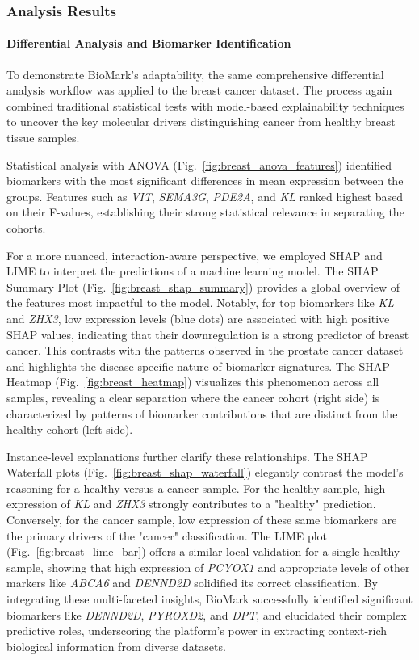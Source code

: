 \documentclass[journal]{IEEEtran}
\begin{document}
\subsubsection{Analysis Results}
\paragraph{Differential Analysis and Biomarker Identification}
To demonstrate BioMark's adaptability, the same comprehensive differential analysis workflow was applied to the breast cancer dataset. The process again combined traditional statistical tests with model-based explainability techniques to uncover the key molecular drivers distinguishing cancer from healthy breast tissue samples.

Statistical analysis with ANOVA (Fig.~\ref{fig:breast_anova_features}) identified biomarkers with the most significant differences in mean expression between the groups. Features such as \textit{VIT}, \textit{SEMA3G}, \textit{PDE2A}, and \textit{KL} ranked highest based on their F-values, establishing their strong statistical relevance in separating the cohorts.

For a more nuanced, interaction-aware perspective, we employed SHAP and LIME to interpret the predictions of a machine learning model. The SHAP Summary Plot (Fig.~\ref{fig:breast_shap_summary}) provides a global overview of the features most impactful to the model. Notably, for top biomarkers like \textit{KL} and \textit{ZHX3}, low expression levels (blue dots) are associated with high positive SHAP values, indicating that their downregulation is a strong predictor of breast cancer. This contrasts with the patterns observed in the prostate cancer dataset and highlights the disease-specific nature of biomarker signatures. The SHAP Heatmap (Fig.~\ref{fig:breast_heatmap}) visualizes this phenomenon across all samples, revealing a clear separation where the cancer cohort (right side) is characterized by patterns of biomarker contributions that are distinct from the healthy cohort (left side).

Instance-level explanations further clarify these relationships. The SHAP Waterfall plots (Fig.~\ref{fig:breast_shap_waterfall}) elegantly contrast the model's reasoning for a healthy versus a cancer sample. For the healthy sample, high expression of \textit{KL} and \textit{ZHX3} strongly contributes to a "healthy" prediction. Conversely, for the cancer sample, low expression of these same biomarkers are the primary drivers of the "cancer" classification. The LIME plot (Fig.~\ref{fig:breast_lime_bar}) offers a similar local validation for a single healthy sample, showing that high expression of \textit{PCYOX1} and appropriate levels of other markers like \textit{ABCA6} and \textit{DENND2D} solidified its correct classification. By integrating these multi-faceted insights, BioMark successfully identified significant biomarkers like \textit{DENND2D}, \textit{PYROXD2}, and \textit{DPT}, and elucidated their complex predictive roles, underscoring the platform's power in extracting context-rich biological information from diverse datasets.
\end{document}
